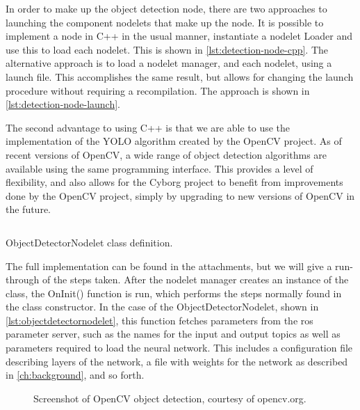 \documentclass[\rootfolder/main.tex]{subfiles}
\begin{document}
In order to make up the object detection node, there are two approaches to launching the component nodelets that make up the node.
It is possible to implement a node in C++ in the usual manner, instantiate a nodelet Loader and use this to load each nodelet.
This is shown in \cref{lst:detection-node-cpp}.
The alternative approach is to load a nodelet manager, and each nodelet, using a launch file.
This accomplishes the same result, but allows for changing the launch procedure without requiring a recompilation.
The approach is shown in \cref{lst:detection-node-launch}.

The second advantage to using C++ is that we are able to use the implementation of the YOLO algorithm created by the OpenCV project.
As of recent versions of OpenCV, a wide range of object detection algorithms are available using the same programming interface.
This provides a level of flexibility, and also allows for the Cyborg project to benefit from improvements done by the OpenCV project, simply by upgrading to new versions of OpenCV in the future.

\begin{listing}
    \inputminted{cpp}{\rootfolder/Chapters/Chapter5/Listings/ObjectDetectorNodelet}
    \caption{ObjectDetectorNodelet class definition.}
    \label{lst:objectdetectornodelet}
\end{listing}

The full implementation can be found in the attachments, but we will give a run-through of the steps taken.
After the nodelet manager creates an instance of the class, the OnInit() function is run, which performs the steps normally found in the class constructor.
In the case of the ObjectDetectorNodelet, shown in \cref{lst:objectdetectornodelet}, this function fetches parameters from the \acrshort{ros} parameter server, such as the names for the input and output topics as well as parameters required to load the neural network.
This includes a configuration file describing layers of the network, a file with weights for the network as described in \cref{ch:background}, and so forth.

\begin{figure}[ht]
    \caption[Screenshot of OpenCV object detection.]%
            {Screenshot of OpenCV object detection, courtesy of opencv.org.}
    \label{fig:opencv}
\end{figure}
\end{document}
